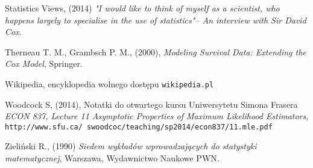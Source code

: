 \begin{thebibliography}{99}
 Statistics Views, (2014) \textit{ "I would like to think of myself as a scientist, who happens largely to specialise in the use of statistics"– An interview with Sir David Cox}. 

 Therneau T. M., Grambsch P. M., (2000), \textit{Modeling Survival Data: Extending the Cox Model}, Springer.

 Wikipedia, encyklopedia wolnego dostępu \texttt{wikipedia.pl}
 
  Woodcock S, (2014), Notatki do otwartego kursu Uniwersytetu Simona Frasera \textit{ECON 837, Lecture 11 Asymptotic Properties of Maximum Likelihood Estimators}, \\ \texttt{http://www.sfu.ca/~swoodcoc/teaching/sp2014/econ837/11.mle.pdf}
 
 Zieliński R., (1990) \textit{Siedem wykładów wprowadzających do statystyki matematycznej}, Warszawa, Wydawnictwo Naukowe PWN.


\end{thebibliography}